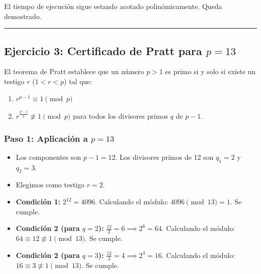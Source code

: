 \documentclass[12pt]{book} %
\begin{document}
El tiempo de ejecución sigue estando acotado polinómicamente. Queda
demostrado.

\begin{center}\rule{0.5\linewidth}{0.5pt}\end{center}

\hypertarget{ejercicio-3-certificado-de-pratt-para-p-13}{%
\subsection{\texorpdfstring{Ejercicio 3: Certificado de Pratt para
\(p = 13\)}{Ejercicio 3: Certificado de Pratt para p = 13}}\label{ejercicio-3-certificado-de-pratt-para-p-13}}

El teorema de Pratt establece que un número \(p > 1\) es primo si y solo
si existe un testigo \(r\) (\(1 < r < p\)) tal que:

\begin{enumerate}
\def\labelenumi{\arabic{enumi}.}
\item
  \(r^{p-1} \equiv 1 \pmod p\)
\item
  \(r^{\frac{p-1}{q}} \not\equiv 1 \pmod p\) para todos los divisores
  primos \(q\) de \(p-1\).
\end{enumerate}

\hypertarget{paso-1-aplicaciuxf3n-a-p-13}{%
\subsubsection{\texorpdfstring{Paso 1: Aplicación a
\(p = 13\)}{Paso 1: Aplicación a p = 13}}\label{paso-1-aplicaciuxf3n-a-p-13}}

\begin{itemize}
\item
  Los componentes son \(p - 1 = 12\). Los divisores primos de 12 son
  \(q_1 = 2\) y \(q_2 = 3\).
\item
  Elegimos como testigo \(r = 2\).
\item
  \textbf{Condición 1:} \(2^{12} = 4096\). Calculando el módulo:
  \(4096 \pmod{13} = 1\). Se cumple.
\item
  \textbf{Condición 2 (para \(q=2\)):}
  \(\frac{12}{2} = 6 \implies 2^6 = 64\). Calculando el módulo:
  \(64 \equiv 12 \not\equiv 1 \pmod{13}\). Se cumple.
\item
  \textbf{Condición 2 (para \(q=3\)):}
  \(\frac{12}{3} = 4 \implies 2^4 = 16\). Calculando el módulo:
  \(16 \equiv 3 \not\equiv 1 \pmod{13}\). Se cumple.
\end{itemize}
\end{document}
